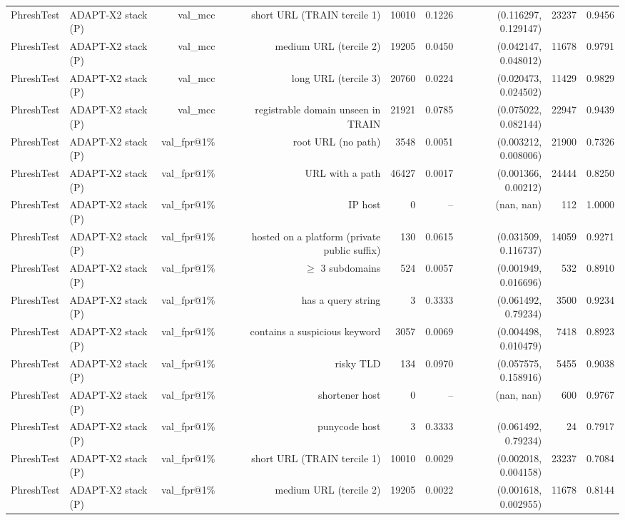 \begin{table}[t]
\begin{tabular}{llrrrrrrr}
PhreshTest & ADAPT-X2 stack (P) & val\_mcc & short URL (TRAIN tercile 1) & 10010 & 0.1226 & (0.116297, 0.129147) & 23237 & 0.9456 \\
PhreshTest & ADAPT-X2 stack (P) & val\_mcc & medium URL (tercile 2) & 19205 & 0.0450 & (0.042147, 0.048012) & 11678 & 0.9791 \\
PhreshTest & ADAPT-X2 stack (P) & val\_mcc & long URL (tercile 3) & 20760 & 0.0224 & (0.020473, 0.024502) & 11429 & 0.9829 \\
PhreshTest & ADAPT-X2 stack (P) & val\_mcc & registrable domain unseen in TRAIN & 21921 & 0.0785 & (0.075022, 0.082144) & 22947 & 0.9439 \\
PhreshTest & ADAPT-X2 stack (P) & val\_fpr@1\% & root URL (no path) & 3548 & 0.0051 & (0.003212, 0.008006) & 21900 & 0.7326 \\
PhreshTest & ADAPT-X2 stack (P) & val\_fpr@1\% & URL with a path & 46427 & 0.0017 & (0.001366, 0.00212) & 24444 & 0.8250 \\
PhreshTest & ADAPT-X2 stack (P) & val\_fpr@1\% & IP host & 0 & -- & (nan, nan) & 112 & 1.0000 \\
PhreshTest & ADAPT-X2 stack (P) & val\_fpr@1\% & hosted on a platform (private public suffix) & 130 & 0.0615 & (0.031509, 0.116737) & 14059 & 0.9271 \\
PhreshTest & ADAPT-X2 stack (P) & val\_fpr@1\% & $\geq$ 3 subdomains & 524 & 0.0057 & (0.001949, 0.016696) & 532 & 0.8910 \\
PhreshTest & ADAPT-X2 stack (P) & val\_fpr@1\% & has a query string & 3 & 0.3333 & (0.061492, 0.79234) & 3500 & 0.9234 \\
PhreshTest & ADAPT-X2 stack (P) & val\_fpr@1\% & contains a suspicious keyword & 3057 & 0.0069 & (0.004498, 0.010479) & 7418 & 0.8923 \\
PhreshTest & ADAPT-X2 stack (P) & val\_fpr@1\% & risky TLD & 134 & 0.0970 & (0.057575, 0.158916) & 5455 & 0.9038 \\
PhreshTest & ADAPT-X2 stack (P) & val\_fpr@1\% & shortener host & 0 & -- & (nan, nan) & 600 & 0.9767 \\
PhreshTest & ADAPT-X2 stack (P) & val\_fpr@1\% & punycode host & 3 & 0.3333 & (0.061492, 0.79234) & 24 & 0.7917 \\
PhreshTest & ADAPT-X2 stack (P) & val\_fpr@1\% & short URL (TRAIN tercile 1) & 10010 & 0.0029 & (0.002018, 0.004158) & 23237 & 0.7084 \\
PhreshTest & ADAPT-X2 stack (P) & val\_fpr@1\% & medium URL (tercile 2) & 19205 & 0.0022 & (0.001618, 0.002955) & 11678 & 0.8144 \\

\end{tabular}
\end{table}
